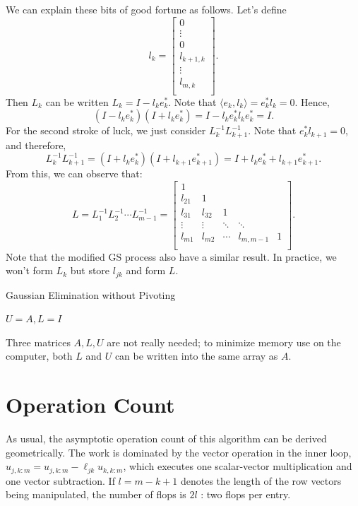 We can explain these bits of good fortune as follows. Let's define 
\[
    l_k = \begin{bmatrix}
         0 \\
         \vdots \\
         0 \\
         l_{k+1,k} \\
         \vdots \\
         l_{m,k} \\
    \end{bmatrix}.  
\]
Then $L_k$ can be written $L_k = I - l_k e_k^*$. Note that $\langle e_k, l_k \rangle  = e_k^* l_k=0$. Hence, 
\[
    (I-l_ke_k^*)(I+l_ke_k^*) = I - l_k e_k^* l_k e_k^* = I. 
\] 
For the second stroke of luck, we just consider $L_k^{-1} L_{k+1}^{-1} $. Note that $e_k^*l_{k+1} = 0$, and therefore, 
\[
    L_k^{-1} L_{k+1}^{-1}  = (I+ l_k e_k^*)(I+l_{k+1}e_{k+1}^*) = I + l_k e_k^* + l_{k+1}e_{k+1}^*. 
\]
From this, we can observe that: 
\[
    L = L_1^{-1}  L_2^{-1}  \cdots L_{m-1}^{-1}  = \begin{bmatrix}
        1 &  &  &  &   \\
        l_{21} & 1 &  &  &   \\
        l_{31} & l_{32} & 1 &  &   \\
        \vdots & \vdots & \ddots & \ddots &   \\
        l_{m1} & l_{m2} & \cdots & l_{m,m-1} &  1 \\
    \end{bmatrix}.  
\]
Note that the modified GS process also have a similar result. In practice, we won't form $L_k$ but store $l_{jk}$ and form $L$.  

\begin{algorithm}[H]
    \caption{Gaussian Elimination without Pivoting}
    \label{Algo 20.1}
    $U=A, L=I$\; 
\end{algorithm}


\begin{note}
Three matrices $A, L, U$ are not really needed; to minimize memory use on the computer, both $L$ and $U$ can be written into the same array as $A$. 
\end{note}

\section{Operation Count}
As usual, the asymptotic operation count of this algorithm can be derived geometrically. The work is dominated by the vector operation in the inner loop, $u_{j, k: m}=u_{j, k: m}-\ell_{j k} u_{k, k: m}$, which executes one scalar-vector multiplication and one vector subtraction. If $l=m-k+1$ denotes the length of the row vectors being manipulated, the number of flops is $2 l$ : two flops per entry.

